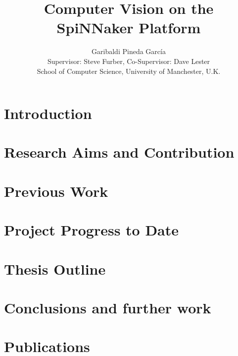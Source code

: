 \documentclass[a4paper]{IEEEtran}
\title{Computer Vision on the SpiNNaker Platform}
\author{Garibaldi Pineda Garc\'ia\\
        Supervisor: Steve Furber, Co-Supervisor: Dave Lester\\
        School of Computer Science, University of Manchester, U.K.}
\date{}
\begin{document}
\thispagestyle{empty}
%
\maketitle


\begin{abstract}

\end{abstract}

\section{Introduction}
\label{sec-intro}


\section{Research Aims and Contribution}
\label{sec-aims-contribs}


\section{Previous Work}
\label{sec-prev-work}


\section{Project Progress to Date}
\label{sec-project-progress}


\section{Thesis Outline}
\label{sec-thesis-toc}


\section{Conclusions and further work}
\label{sec-conclusions}


\section{Publications}
\label{sec-publications}

\end{document}
